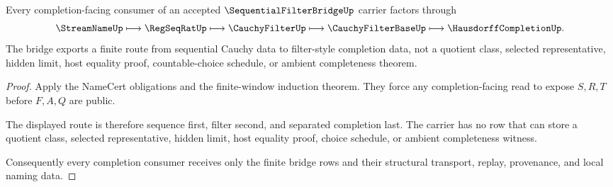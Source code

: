 \begin{theorem}
\label{thm:sequential-filter-bridge-representative-nonescape}
Every completion-facing consumer of an accepted $\SequentialFilterBridgeUp$ carrier factors through
$$
\StreamNameUp \longmapsto \RegSeqRatUp \longmapsto \CauchyFilterUp \longmapsto \CauchyFilterBaseUp \longmapsto \HausdorffCompletionUp .
$$
The bridge exports a finite route from sequential Cauchy data to filter-style completion data, not a quotient class, selected representative, hidden limit, host equality proof, countable-choice schedule, or ambient completeness theorem.
\end{theorem}
\begin{proof}
Apply the NameCert obligations and the finite-window induction theorem. They force any completion-facing read to expose $S,R,T$ before $F,A,Q$ are public.

The displayed route is therefore sequence first, filter second, and separated completion last. The carrier has no row that can store a quotient class, selected representative, hidden limit, host equality proof, choice schedule, or ambient completeness witness.

Consequently every completion consumer receives only the finite bridge rows and their structural transport, replay, provenance, and local naming data.
\end{proof}




